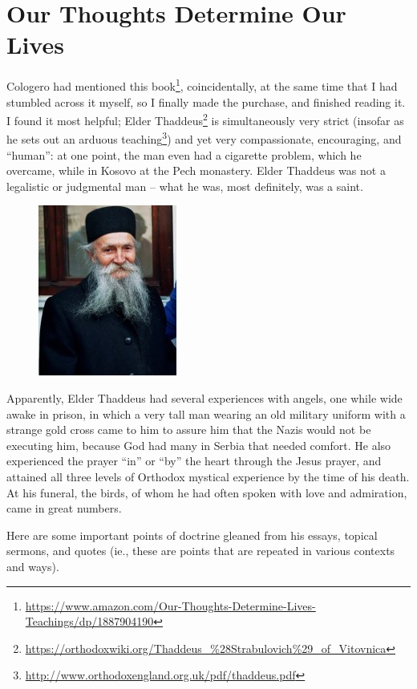\section{Our Thoughts Determine Our Lives}

Cologero had mentioned this book\footnote{\url{https://www.amazon.com/Our-Thoughts-Determine-Lives-Teachings/dp/1887904190}}, coincidentally, at the same time that I had stumbled across it myself, so I finally made the purchase, and finished reading it. I found it most helpful; Elder Thaddeus\footnote{\url{https://orthodoxwiki.org/Thaddeus_\%28Strabulovich\%29_of_Vitovnica}} is simultaneously very strict (insofar as he sets out an arduous teaching\footnote{\url{http://www.orthodoxengland.org.uk/pdf/thaddeus.pdf}}) and yet very compassionate, encouraging, and “human”: at one point, the man even had a cigarette problem, which he overcame, while in Kosovo at the Pech monastery. Elder Thaddeus was not a legalistic or judgmental man – what he was, most definitely, was a saint.

\begin{figure}
 \includegraphics[scale=.6]{a20130412OurThoughtsDetermineOurLives-img001.jpg}
\end{figure}

Apparently, Elder Thaddeus had several experiences with angels, one while wide awake in prison, in which a very tall man wearing an old military uniform with a strange gold cross came to him to assure him that the Nazis would not be executing him, because God had many in Serbia that needed comfort. He also experienced the prayer “in” or “by” the heart through the Jesus prayer, and attained all three levels of Orthodox mystical experience by the time of his death. At his funeral, the birds, of whom he had often spoken with love and admiration, came in great numbers.

Here are some important points of doctrine gleaned from his essays, topical sermons, and quotes (ie., these are points that are repeated in various contexts and ways).

